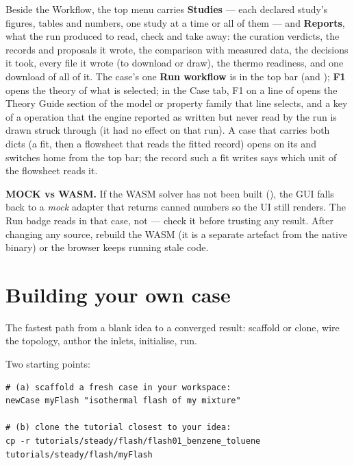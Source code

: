 \documentclass[11pt,a4paper]{article}
\begin{document}
Beside the Workflow, the top menu carries \textbf{Studies} --- each
declared study's figures, tables and numbers, one study at a time or all
of them --- and \textbf{Reports}, what the run produced to read, check
and take away: the curation verdicts, the records and proposals it wrote,
the comparison with measured data, the decisions it took, every file it
wrote (to download or draw), the thermo readiness, and one download of
all of it.  The case's one \textbf{Run workflow} is in the top bar (and
); \textbf{F1} opens the theory of what is selected; in the
Case tab, F1 on a line of  opens the Theory
Guide section of the model or property family that line selects, and a key of
a  operation that the engine reported as written but never
read by the run is drawn struck through (it had no effect on that run).  A
case that carries both dicts (a fit, then a flowsheet that reads the
fitted record) opens on its  and switches
home from the top bar; the record such a fit writes says which unit of
the flowsheet reads it.

\begin{pitfall}
\textbf{MOCK vs WASM.}  If the WASM solver has not been built
(), the GUI falls back to a \emph{mock} adapter
that returns canned numbers so the UI still renders.  The Run badge
reads  in that case, not  --- check it before
trusting any result.  After changing any \cpp{} source, rebuild the
WASM (it is a separate artefact from the native binary) or the browser
keeps running stale code.
\end{pitfall}

\section{Building your own case}\label{sec:build-own}

\begin{whatyoulllearn}
The fastest path from a blank idea to a converged result: scaffold or
clone, wire the topology, author the inlets, initialise, run.
\end{whatyoulllearn}

Two starting points:

\begin{lstlisting}
# (a) scaffold a fresh case in your workspace:
newCase myFlash "isothermal flash of my mixture"

# (b) clone the tutorial closest to your idea:
cp -r tutorials/steady/flash/flash01_benzene_toluene tutorials/steady/flash/myFlash
\end{lstlisting}
\end{document}
